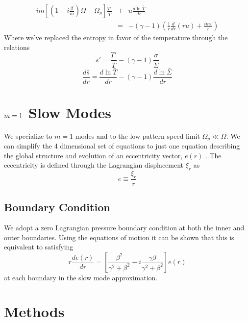\documentclass[apj]{emulateapj}
\begin{document}
\begin{eqnarray}
i m \left[ \left( 1 - i \frac{\beta}{m} \right) \Omega - \Omega_p \right] \frac{T'}{\bar{T} } &+& u \frac{d  \ln \bar{T}}{d r}   \\ 
&=& -(\gamma -1)  \left( \frac{1}{r} \frac{d }{d r} ( r u) + \frac{ i m v}{r } \right) \nonumber
\end{eqnarray}
Where we've replaced the entropy in favor of the temperature through the relations
\begin{equation}
s' = \frac{ T'}{ \bar{T}} - (\gamma -1 ) \frac{ \sigma}{ \bar{\Sigma}} 
\end{equation}
\begin{equation}
\frac{d \bar{s}}{d r} = \frac{d \ln \bar{T}}{d r} - (\gamma -1) \frac{ d \ln \bar{\Sigma}}{d r} 
\end{equation}


\section{ $\MakeLowercase{m}=1$ Slow Modes }
We specialize to $m=1$ modes and to the low pattern speed limit $\Omega_p \ll \Omega$. We can simplify the 4 dimensional set of equations to just one equation describing the global structure and evolution of an eccentricity vector, $e(r)$ \citep{og01,go06,papa02}. The eccentricity is defined through the Lagrangian displacement $\xi_r$ as 
\begin{equation}
e \equiv \frac{ \xi_r} {r} 
\end{equation}
 


\subsection{Boundary Condition} 
We adopt a zero Lagrangian pressure boundary condition at both the inner and outer boundaries. Using the equations of motion it can be shown that this is equivalent to satisfying 
\begin{equation}
r \frac{d e(r) }{d r} = \left[ \frac{ \beta^2}{\gamma^2 + \beta^2} - i \frac{ \gamma \beta}{\gamma^2 + \beta^2} \right] e(r)
\end{equation}
at each boundary in the slow mode approximation. 

\section{Methods}
\end{document}
